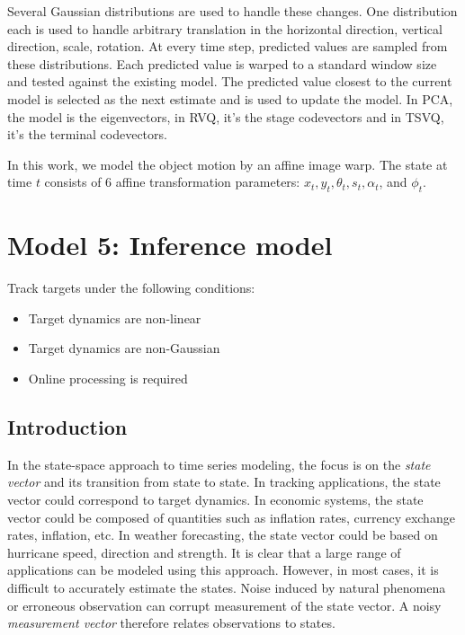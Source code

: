 Several Gaussian distributions are used to handle these changes.  One distribution each is used to handle arbitrary translation in the horizontal direction, vertical direction, scale, rotation.  At every time step, predicted values are sampled from these distributions.  Each predicted value is warped to a standard window size and tested against the existing model.  The predicted value closest to the current model is selected as the next estimate and is used to update the model.  In PCA, the model is the eigenvectors, in RVQ, it's the stage codevectors and in TSVQ, it's the terminal codevectors.  

In this work, we model the object motion by an affine image warp.  The state at time $t$ consists of 6 affine transformation parameters: $x_t,  y_t, \theta_t, s_t, \alpha_t$, and $\phi_t$.




\section{Model 5: Inference model}
Track targets under the following conditions:

\begin{itemize}
\item Target dynamics are non-linear
\item Target dynamics are non-Gaussian
\item Online processing is required
\end{itemize}


\subsection{Introduction}
In the state-space approach to time series modeling, the focus is on the \emph{state vector} and its transition from state to state.  In tracking applications, the state vector could correspond to target dynamics.  In economic systems, the state vector could be composed of quantities such as inflation rates, currency exchange rates, inflation, etc.  In weather forecasting, the state vector could be based on hurricane speed, direction and strength.  It is clear that a large range of applications can be modeled using this approach.  However, in most cases, it is difficult to accurately estimate the states.  Noise induced by natural phenomena or erroneous observation can corrupt measurement of the state vector.  A noisy \emph{measurement vector} therefore relates observations to states.

